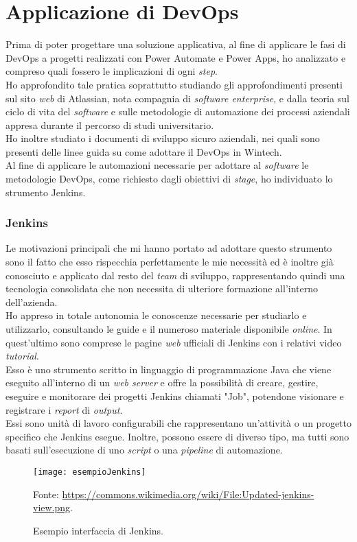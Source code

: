 \section{Applicazione di DevOps}%
Prima di poter progettare una soluzione applicativa, al fine di applicare le fasi di \gls{DevOps} a progetti realizzati con Power Automate e Power Apps, ho analizzato e compreso quali fossero le implicazioni di ogni \emph{step}.\\
Ho approfondito tale pratica soprattutto studiando gli approfondimenti presenti sul sito \emph{web} di Atlassian, nota compagnia di \emph{software enterprise}, e dalla teoria sul ciclo di vita del \emph{software} e sulle metodologie di automazione dei processi aziendali appresa durante il percorso di studi universitario.\\
Ho inoltre studiato i documenti di sviluppo sicuro aziendali, nei quali sono presenti delle linee guida su come adottare il \gls{DevOps} in Wintech.\\
Al fine di applicare le automazioni necessarie per adottare al \emph{software} le metodologie \gls{DevOps}, come richiesto dagli obiettivi di \emph{stage}, ho individuato lo strumento Jenkins.\\

\subsubsection*{Jenkins}
Le motivazioni principali che mi hanno portato ad adottare questo strumento sono il fatto che esso rispecchia perfettamente le mie necessità ed è inoltre già conosciuto e applicato dal resto del \emph{team} di sviluppo, rappresentando quindi una tecnologia consolidata che non necessita di ulteriore formazione all'interno dell'azienda.\\
Ho appreso in totale autonomia le conoscenze necessarie per studiarlo e utilizzarlo, consultando le guide e il numeroso materiale disponibile \emph{online}. In quest'ultimo sono comprese le pagine \emph{web} ufficiali di Jenkins con i relativi video \emph{tutorial}.\\
Esso è uno strumento scritto in linguaggio di programmazione Java che viene eseguito all'interno di un \emph{web server} e offre la possibilità di creare, gestire, eseguire e monitorare dei progetti Jenkins chiamati "Job", potendone visionare e registrare i \emph{report} di \emph{output}.\\
Essi sono unità di lavoro configurabili che rappresentano un'attività o un progetto specifico che Jenkins esegue. Inoltre, possono essere di diverso tipo, ma tutti sono basati sull'esecuzione di uno \emph{script} o una \emph{pipeline} di automazione.\\
\begin{figure}[htbp] 
    \centering 
    \texttt{[image: esempioJenkins]} 
    \caption{Esempio interfaccia di Jenkins.}
    \label{fig:esempioJenkins}
    \vspace{1mm}
    Fonte: \url{https://commons.wikimedia.org/wiki/File:Updated-jenkins-view.png}.
\end{figure}

